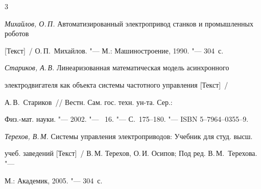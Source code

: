 \begin{thebibliography}{3}



\item \emph{Михайлов, О.\,П.} Автоматизированный электропривод станков и промышленных роботов

[Текст]~/ О.\,П.~Михайлов. "--- М.: Машиностроение, 1990. "--- 304~с.





\item \emph{Стариков, А.\,В.} Линеаризованная математическая модель асинхронного 

электродвигателя как объекта системы частотного управления [Текст]~/ 

А.\,В.~Стариков~/\!/ Вестн. Сам. гос. техн. ун-та.  Сер.:

Физ.-мат. науки. "--- 2002. "--- \No~16. "--- С.~175--180. "--- ISBN 5--7964--0355--9.



\item \emph{Терехов, В.\,М.} Системы управления электроприводов: Учебник для студ. высш. 

учеб. заведений [Текст]~/ В.\,М. Терехов, О.\,И. Осипов; Под ред. В.\,М.~Терехова. "--- 

М.: Академик, 2005. "--- 304~с. 

\end{thebibliography}



\vspace{8mm}



\makeengtitle







%

